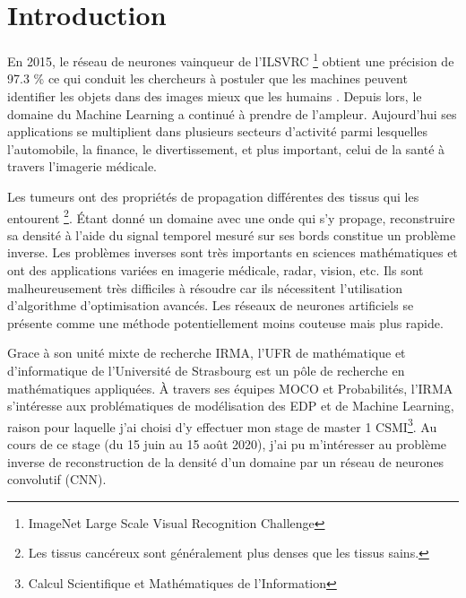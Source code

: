 
\chapter{Introduction} %

\label{Chapter1} %


\newcommand{\keyword}[1]{\textbf{#1}}
\newcommand{\tabhead}[1]{\textbf{#1}}
\newcommand{\code}[1]{\texttt{#1}}
\newcommand{\file}[1]{\texttt{\bfseries#1}}
\newcommand{\option}[1]{\texttt{\itshape#1}}


En 2015, le réseau de neurones vainqueur de l'ILSVRC \footnote{ImageNet Large Scale Visual Recognition Challenge} obtient une précision de 97.3 \% ce qui conduit les chercheurs à postuler que les machines peuvent identifier les objets dans des images mieux que les humains \parencite{Reference1}. Depuis lors, le domaine du Machine Learning a continué à prendre de l'ampleur. Aujourd'hui ses applications se multiplient dans plusieurs secteurs d'activité parmi lesquelles l'automobile, la finance, le divertissement, et plus important, celui de la santé à travers l'imagerie médicale.

Les tumeurs ont des propriétés de propagation différentes des tissus qui les entourent \footnote{Les tissus cancéreux sont généralement plus denses que les tissus sains.}. Étant donné un domaine avec une onde qui s'y propage, reconstruire sa densité à l'aide du signal temporel mesuré sur ses bords constitue un problème inverse. Les problèmes inverses sont très importants en sciences mathématiques et ont des applications variées en imagerie médicale, radar, vision, etc. Ils sont malheureusement très difficiles à résoudre car ils nécessitent l'utilisation d'algorithme d'optimisation avancés. Les réseaux de neurones artificiels se présente comme une méthode potentiellement moins couteuse mais plus rapide.

Grace à son unité mixte de recherche IRMA, l'UFR de mathématique et d'informatique de l'Université de Strasbourg est un pôle de recherche en mathématiques appliquées. À travers ses équipes MOCO et Probabilités, l'IRMA s'intéresse aux problématiques de modélisation des EDP et de Machine Learning, raison pour laquelle j'ai choisi d'y effectuer mon stage de master 1 CSMI\footnote{Calcul Scientifique et Mathématiques de l'Information}. Au cours de ce stage (du 15 juin au 15 août 2020), j'ai pu m'intéresser au problème inverse de reconstruction de la densité d'un domaine par un réseau de neurones convolutif (CNN).

